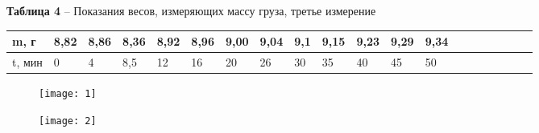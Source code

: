 \documentclass[12pt,a4paper]{article}
\begin{document}
        \begin{table}[!h]
        \begin{flushleft}
       		\hspace{30}\textbf{Таблица 4} -- Показания весов, измеряющих массу груза, третье измерение \\
        \end{flushleft}
            \begin{center}
                \begin{tabular}{| l | l | l | l | l | l | l | l | l | l |l | l | l | l | l | l | l | l | l | l |}
                \hline
                m, г    &  8,82    &   8,86    &   8,36    &   8,92    &   8,96    &   9,00    &   9,04    &   9,1     &   9,15    &   9,23    &   9,29    &  9,34 \\
                \hline
                t, мин    &  0       &   4       &   8,5     &   12      &   16      &   20      &   26      &    30     &   35      &   40      &   45      &  50   \\
               \hline                
               \end{tabular}
            \end{center}
        \end{table}
        \begin{figure}[h!]
        	\begin{center}
        		\texttt{[image: 1]}\\
            	{\scriptsize
            	\begin{center}
            	\hspace{69pt}{Рисунок 2 -- График зависимости массы шарика с грузом от времени в 1 измерении}
            	\end{center}}
        	\end{center}
            \label{scheme1}
        \end{figure}

        \begin{figure}[h!]
        	\begin{center}
        		\texttt{[image: 2]}\\
            	{\scriptsize
            	\begin{center}
            	\hspace{69pt}{Рисунок 3 -- График зависимости массы шарика с грузом от времени в 2 измерении}
            	\end{center}}
        	\end{center}
            \label{scheme1}
        \end{figure}
\end{document}

